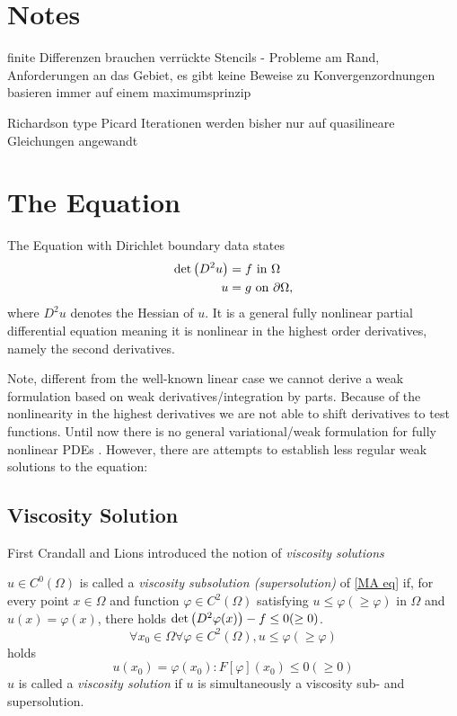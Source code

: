 \section{Notes}
finite Differenzen brauchen verrückte Stencils - Probleme am Rand, Anforderungen an das Gebiet, es gibt keine Beweise zu Konvergenzordnungen
basieren immer auf einem maximumsprinzip

Richardson type Picard Iterationen werden bisher nur auf quasilineare Gleichungen angewandt



\section{The \MA Equation}

The \MA Equation with Dirichlet boundary data states
\begin{align}
	 \det{\left(D^2 u\right)} &= f \textnormal{ in } \Omega \label{MA eq}\\
	 u & = g \textnormal{ on } \partial \Omega,
\end{align}
where $D^2 u$ denotes the Hessian of $u$.
It is a general fully nonlinear partial differential equation meaning it is nonlinear in the highest order derivatives, namely the second derivatives.

Note, different from the well-known linear case we cannot derive a weak formulation based on weak derivatives/integration by parts. Because of the nonlinearity in the highest derivatives we are not able to shift derivatives to test functions. Until now there is no general variational/weak formulation for fully nonlinear PDEs \cite{FGN2013}.
However, there are attempts to establish less regular weak solutions to the \MA equation:

\subsection{Viscosity Solution}
First Crandall and Lions \cite{58} introduced the notion of \emph{viscosity solutions}

\begin{definition}
	$u \in C^0(\Omega)$ is called a \emph{viscosity subsolution (supersolution)} of \eqref{MA eq} if, for every point $x \in \Omega$ and function $\varphi \in C^2(\Omega)$ satisfying $u \leq \varphi (\geq \varphi)$ in $\Omega$ and $u(x) = \varphi(x)$, there holds $\det{\left(D^2 \varphi(x)\right)} - f \leq 0 (\geq 0)$. 
	\[
	\forall x_0 \in \Omega \forall \varphi \in C^2(\Omega), u \leq \varphi (\geq \varphi)
	\] holds
	\[
	u(x_0) = \varphi(x_0) : F[\varphi](x_0) \leq 0 (\geq 0)
	\]
	$u$ is called a \emph{viscosity solution} if $u$ is simultaneously a viscosity sub- and supersolution.
\end{definition}

